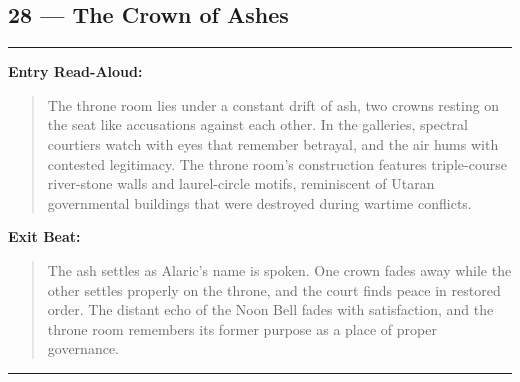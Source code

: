 \documentclass[18pt, letterpaper, twoside]{article}
\newenvironment{floorbox}[1]{%
    \begin{center}
    \begin{minipage}{0.95\textwidth}
    \subsection*{#1}
    \vspace{-0.5em}
    \rule{\textwidth}{0.5pt}
    \vspace{0.5em}
}{%
    \vspace{0.5em}
    \rule{\textwidth}{0.5pt}
    \end{minipage}
    \end{center}
}
\newenvironment{boxedtext}[1]{%
    \vspace{0.5em}
    \noindent\textbf{#1}
    \begin{quote}
}{%
    \end{quote}
    \vspace{0.5em}
}
\newcommand{\entrytext}[1]{\begin{boxedtext}{Entry Read-Aloud:} #1 \end{boxedtext}}
\newcommand{\exittext}[1]{\begin{boxedtext}{Exit Beat:} #1 \end{boxedtext}}
\begin{document}
\begin{floorbox}{28 --- The Crown of Ashes}
\entrytext{The throne room lies under a constant drift of ash, two crowns resting on the seat like accusations against each other. In the galleries, spectral courtiers watch with eyes that remember betrayal, and the air hums with contested legitimacy. The throne room's construction features triple-course river-stone walls and laurel-circle motifs, reminiscent of Utaran governmental buildings that were destroyed during wartime conflicts.}

\exittext{The ash settles as Alaric's name is spoken. One crown fades away while the other settles properly on the throne, and the court finds peace in restored order. The distant echo of the Noon Bell fades with satisfaction, and the throne room remembers its former purpose as a place of proper governance.}
\end{floorbox}

\end{document}
